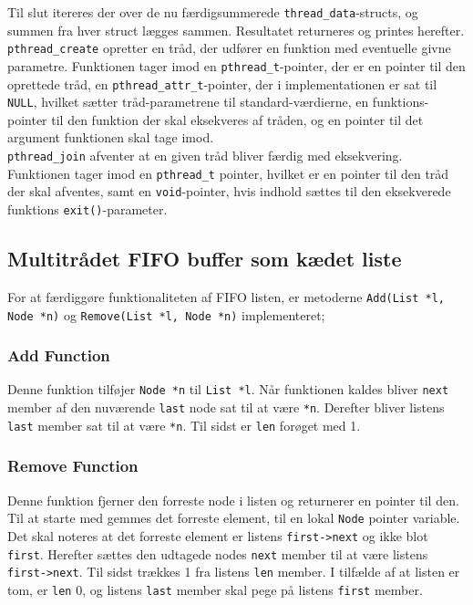 Til slut itereres der over de nu færdigsummerede \texttt{thread\_data}-structs, og summen fra hver struct lægges sammen. Resultatet returneres og printes herefter. \\ 

\texttt{pthread\_create} opretter en tråd, der udfører en funktion med eventuelle givne parametre. 
Funktionen tager imod en \texttt{pthread\_t}-pointer, der er en pointer til den oprettede tråd, en \texttt{pthread\_attr\_t}-pointer, der i implementationen er sat til \texttt{NULL}, hvilket sætter tråd-parametrene til standard-værdierne, en funktions-pointer til den funktion der skal eksekveres af tråden, og en pointer til det argument funktionen skal tage imod. \\

\texttt{pthread\_join} afventer at en given tråd bliver færdig med eksekvering. 
Funktionen tager imod en \texttt{pthread\_t} pointer, hvilket er en pointer til den tråd der skal afventes, samt en \texttt{void}-pointer, hvis indhold sættes til den eksekverede funktions \texttt{exit()}-parameter.\\

\subsection{Multitrådet FIFO buffer som kædet liste}
\label{list.c}
For at færdiggøre funktionaliteten af FIFO listen, er metoderne \texttt{Add(List *l, Node *n)} og \texttt{Remove(List *l, Node *n)} implementeret;

\subsubsection{Add Function}
Denne funktion tilføjer \texttt{Node *n} til \texttt{List *l}. Når funktionen kaldes bliver \texttt{next} member af den nuværende \texttt{last} node sat til at være \texttt{*n}. Derefter bliver listens \texttt{last} member sat til at være \texttt{*n}. Til sidst er \texttt{len} forøget med 1.

\subsubsection{Remove Function}
Denne funktion fjerner den forreste node i listen og returnerer en pointer til den. Til at starte med gemmes det forreste element, til en lokal \texttt{Node} pointer variable. Det skal noteres at det forreste element er listens \texttt{first->next} og ikke blot \texttt{first}. Herefter sættes den udtagede nodes \texttt{next} member til at være listens \texttt{first->next}. Til sidst trækkes 1 fra listens \texttt{len} member. I tilfælde af at listen er tom, er \texttt{len} 0, og listens \texttt{last} member skal pege på listens \texttt{first} member. \\

